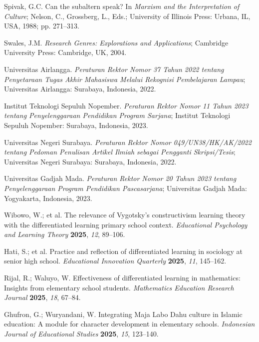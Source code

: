 \documentclass[journal,article,submit,pdftex,moreauthors]{Definitions/mdpi}
\begin{document}
\begin{thebibliography}{999}
 Spivak, G.C. Can the subaltern speak? In \textit{Marxism and the Interpretation of Culture}; Nelson, C., Grossberg, L., Eds.; University of Illinois Press: Urbana, IL, USA, 1988; pp. 271--313.

 Swales, J.M. \textit{Research Genres: Explorations and Applications}; Cambridge University Press: Cambridge, UK, 2004.

 Universitas Airlangga. \textit{Peraturan Rektor Nomor 37 Tahun 2022 tentang Penyetaraan Tugas Akhir Mahasiswa Melalui Rekognisi Pembelajaran Lampau}; Universitas Airlangga: Surabaya, Indonesia, 2022.

 Institut Teknologi Sepuluh Nopember. \textit{Peraturan Rektor Nomor 11 Tahun 2023 tentang Penyelenggaraan Pendidikan Program Sarjana}; Institut Teknologi Sepuluh Nopember: Surabaya, Indonesia, 2023.

 Universitas Negeri Surabaya. \textit{Peraturan Rektor Nomor 049/UN38/HK/AK/2022 tentang Pedoman Penulisan Artikel Ilmiah sebagai Pengganti Skripsi/Tesis}; Universitas Negeri Surabaya: Surabaya, Indonesia, 2022.

 Universitas Gadjah Mada. \textit{Peraturan Rektor Nomor 20 Tahun 2023 tentang Penyelenggaraan Program Pendidikan Pascasarjana}; Universitas Gadjah Mada: Yogyakarta, Indonesia, 2023.

 Wibowo, W.; et al. The relevance of Vygotsky's constructivism learning theory with the differentiated learning primary school context. \textit{Educational Psychology and Learning Theory} \textbf{2025}, \textit{12}, 89--106.

 Hati, S.; et al. Practice and reflection of differentiated learning in sociology at senior high school. \textit{Educational Innovation Quarterly} \textbf{2025}, \textit{11}, 145--162.

 Rijal, R.; Waluyo, W. Effectiveness of differentiated learning in mathematics: Insights from elementary school students. \textit{Mathematics Education Research Journal} \textbf{2025}, \textit{18}, 67--84.

 Ghufron, G.; Wuryandani, W. Integrating Maja Labo Dahu culture in Islamic education: A module for character development in elementary schools. \textit{Indonesian Journal of Educational Studies} \textbf{2025}, \textit{15}, 123--140.


\end{thebibliography}
\end{document}
